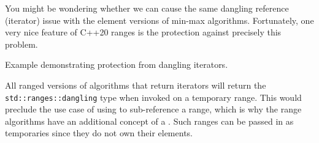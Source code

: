 You might be wondering whether we can cause the same dangling reference (iterator) issue with the element versions of min-max algorithms. Fortunately, one very nice feature of C++20 ranges is the protection against precisely this problem.

\begin{box-note}
\footnotesize Example demonstrating protection from dangling iterators.
\tcblower
{}
\end{box-note}

All ranged versions of algorithms that return iterators will return the \texttt{std::ranges\-::dangling} type when invoked on a temporary range. This would preclude the use case of using  to sub-reference a range, which is why the range algorithms have an additional concept of a . Such ranges can be passed in as temporaries since they do not own their elements.